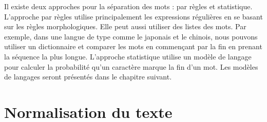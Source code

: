 \documentclass{KodeBook}
\begin{document}
Il existe deux approches pour la séparation des mots : par règles et statistique. 
L'approche par règles utilise principalement les expressions régulières en se basant sur les règles morphologiques.
Elle peut aussi utiliser des listes des mots. 
Par exemple, dans une langue de type  comme le japonais et le chinois, nous pouvons utiliser un dictionnaire et comparer les mots en commençant par la fin en prenant la séquence la plus longue.
L'approche statistique utilise un modèle de langage pour calculer la probabilité qu'un caractère marque la fin d'un mot. 
Les modèles de langages seront présentés dans le chapitre suivant. 


\section{Normalisation du texte}
\end{document}
